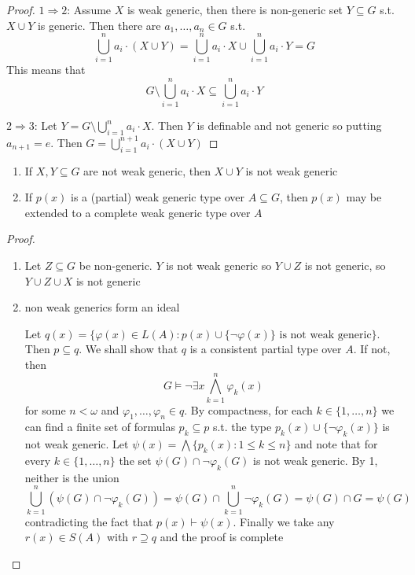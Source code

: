 \documentclass[11pt]{article}
\begin{document}
\begin{proof}
\(1\Rightarrow 2\): Assume \(X\) is weak generic, then there is non-generic set \(Y\subseteq G\) s.t. \(X\cup Y\) is
generic. Then there are \(a_1,\dots,a_n\in G\) s.t.
\begin{equation*}
\bigcup_{i=1}^na_i\cdot(X\cup Y)=\bigcup_{i=1}^na_i\cdot X\cup\bigcup_{i=1}^na_i\cdot Y=G
\end{equation*}
This means that
\begin{equation*}
G\setminus\bigcup_{i=1}^na_i\cdot X\subseteq\bigcup_{i=1}^na_i\cdot Y
\end{equation*}

\(2\Rightarrow 3\): Let \(Y=G\setminus\bigcup_{i=1}^na_i\cdot X\). Then \(Y\) is definable and not generic so
putting \(a_{n+1}=e\). Then \(G=\bigcup_{i=1}^{n+1}a_i\cdot(X\cup Y)\)
\end{proof}

\begin{lemma}[]
\label{3.2.2}
\begin{enumerate}
\item If \(X,Y\subseteq G\) are not weak generic, then \(X\cup Y\) is not weak generic
\item If \(p(x)\) is a (partial) weak generic type over \(A\subseteq G\), then \(p(x)\) may be extended to
a complete weak generic type over \(A\)
\end{enumerate}
\end{lemma}

\begin{proof}
\begin{enumerate}
\item Let \(Z\subseteq G\)  be non-generic. \(Y\) is not weak generic so \(Y\cup Z\) is not generic,
so \(Y\cup Z\cup X\) is not generic
\item non weak generics form an ideal

Let \(q(x)=\{\varphi(x)\in L(A):p(x)\cup\{\neg\varphi(x)\}\text{ is not weak generic}\}\). Then \(p\subseteq q\). We shall
show that \(q\) is a consistent partial type over \(A\). If not, then
\begin{equation*}
G\vDash\neg\exists x\bigwedge_{k=1}^n\varphi_k(x)
\end{equation*}
for some \(n<\omega\) and \(\varphi_1,\dots,\varphi_n\in q\). By compactness, for each \(k\in\{1,\dots,n\}\) we can find a
finite set of formulas \(p_k\subseteq p\) s.t. the type \(p_k(x)\cup\{\neg\varphi_k(x)\}\) is not weak generic.
Let \(\psi(x)=\bigwedge\{p_k(x):1\le k\le n\}\) and note that for every \(k\in\{1,\dots,n\}\) the set \(\psi(G)\cap\neg\varphi_k(G)\)
is not weak generic. By 1, neither is the union
\begin{equation*}
\bigcup_{k=1}^n(\psi(G)\cap\neg\varphi_k(G))=\psi(G)\cap\bigcup_{k=1}^n\neg\varphi_k(G)=\psi(G)\cap G=\psi(G)
\end{equation*}
contradicting the fact that \(p(x)\vdash\psi(x)\). Finally we take any \(r(x)\in S(A)\)
with \(r\supseteq q\) and the proof is complete
\end{enumerate}
\end{proof}
\end{document}
